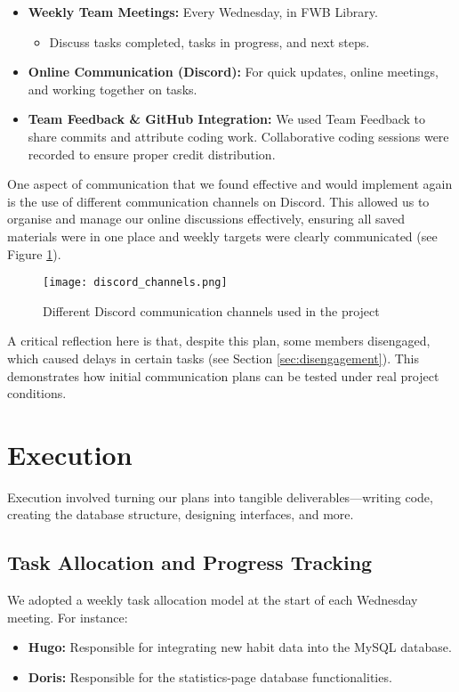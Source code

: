 \begin{itemize}
    \item \textbf{Weekly Team Meetings:} Every Wednesday, in FWB Library.
    \begin{itemize}
        \item Discuss tasks completed, tasks in progress, and next steps.
    \end{itemize}
    \item \textbf{Online Communication (Discord):} For quick updates, online meetings, and working together on tasks.
    \item \textbf{Team Feedback \& GitHub Integration:} We used Team Feedback to share commits and attribute coding work. Collaborative coding sessions were recorded to ensure proper credit distribution.
\end{itemize}

One aspect of communication that we found effective and would implement again is the use of different communication channels on Discord. This allowed us to organise and manage our online discussions effectively, ensuring all saved materials were in one place and weekly targets were clearly communicated (see Figure \ref{fig:discord_channels}).

\begin{figure}[H]
    \centering
    \texttt{[image: discord\_channels.png]} %
    \caption{Different Discord communication channels used in the project}
    \label{fig:discord_channels}
\end{figure}

A critical reflection here is that, despite this plan, some members disengaged, which caused delays in certain tasks (see Section \ref{sec:disengagement}). This demonstrates how initial communication plans can be tested under real project conditions.

\section{Execution}
Execution involved turning our plans into tangible deliverables—writing code, creating the database structure, designing interfaces, and more.

\subsection{Task Allocation and Progress Tracking}
We adopted a weekly task allocation model at the start of each Wednesday meeting. For instance:
\begin{itemize}
    \item \textbf{Hugo:} Responsible for integrating new habit data into the MySQL database.
    \item \textbf{Doris:} Responsible for the statistics-page database functionalities.
\end{itemize}

